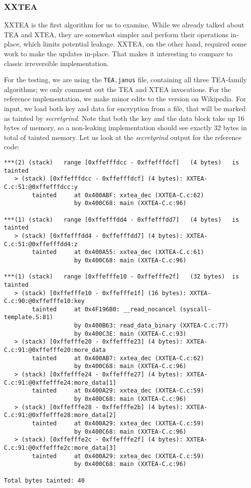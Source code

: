 \documentclass[a4paper,10pt,openright]{memoir}
\newcommand{\term}[1]{\textit{#1}}
\newcommand{\code}[1]{\texttt{#1}}
\begin{document}
\subsubsection{XXTEA}

XXTEA is the first algorithm for us to examine. While we already talked 
about TEA and XTEA, they are somewhat simpler and perform their 
operations in-place, which limits potential leakage. XXTEA, on the 
other hand, required some work to make the updates in-place. That makes 
it interesting to compare to classic irreversible implementation.

For the testing, we are using the \code{TEA.janus} file, containing all 
three TEA-family algorithms; we only comment out the TEA and XTEA 
invocations. For the reference implementation, we make minor edits to 
the version on Wikipedia. For input, we load 
both key and data for encryption from a file, that will be marked as 
tainted by \term{secretgrind}. Note that both the key and the data 
block take up 16 bytes of memory, so a non-leaking implementation 
should see exactly 32 bytes in total of tainted memory. Let us look at 
the \term{secretgrind} output for the reference code:

\begin{verbatim}
***(2) (stack)	 range [0xffefffdcc - 0xffefffdcf]	 (4 bytes)	 is tainted
   > (stack) [0xffefffdcc - 0xffefffdcf] (4 bytes): XXTEA-C.c:51:@0xffefffdcc:y
        tainted     at 0x400ABF: xxtea_dec (XXTEA-C.c:62)
                    by 0x400C68: main (XXTEA-C.c:96)

***(1) (stack)	 range [0xffefffdd4 - 0xffefffdd7]	 (4 bytes)	 is tainted
   > (stack) [0xffefffdd4 - 0xffefffdd7] (4 bytes): XXTEA-C.c:51:@0xffefffdd4:z
        tainted     at 0x400A55: xxtea_dec (XXTEA-C.c:61)
                    by 0x400C68: main (XXTEA-C.c:96)

***(1) (stack)	 range [0xffefffe10 - 0xffefffe2f]	 (32 bytes)	 is tainted
   > (stack) [0xffefffe10 - 0xffefffe1f] (16 bytes): XXTEA-C.c:90:@0xffefffe10:key
        tainted     at 0x4F196B0: __read_nocancel (syscall-template.S:81)
                    by 0x400B63: read_data_binary (XXTEA-C.c:77)
                    by 0x400C3E: main (XXTEA-C.c:93)
   > (stack) [0xffefffe20 - 0xffefffe23] (4 bytes): XXTEA-C.c:91:@0xffefffe20:more_data
        tainted     at 0x400AB7: xxtea_dec (XXTEA-C.c:62)
                    by 0x400C68: main (XXTEA-C.c:96)
   > (stack) [0xffefffe24 - 0xffefffe27] (4 bytes): XXTEA-C.c:91:@0xffefffe24:more_data[1]
        tainted     at 0x400A29: xxtea_dec (XXTEA-C.c:59)
                    by 0x400C68: main (XXTEA-C.c:96)
   > (stack) [0xffefffe28 - 0xffefffe2b] (4 bytes): XXTEA-C.c:91:@0xffefffe28:more_data[2]
        tainted     at 0x400A29: xxtea_dec (XXTEA-C.c:59)
                    by 0x400C68: main (XXTEA-C.c:96)
   > (stack) [0xffefffe2c - 0xffefffe2f] (4 bytes): XXTEA-C.c:91:@0xffefffe2c:more_data[3]
        tainted     at 0x400A29: xxtea_dec (XXTEA-C.c:59)
                    by 0x400C68: main (XXTEA-C.c:96)

Total bytes tainted: 40
\end{verbatim}
\end{document}
